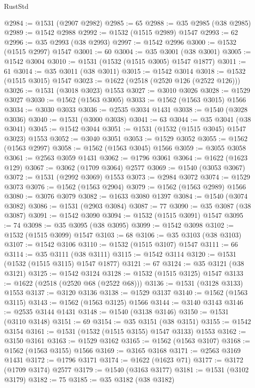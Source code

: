 \begin{lexlean}{RustStd}
\begin{coremodule}
{\begin{coremodule}
{{{{{{{{{{{{{{{{{{{{{{{{{{{{{{{{@2984 := @1531 (@2907 @2982)
@2985 := 65
@2988 := @35 @2985 (@38 @2985)
@2989 := @1542 @2988
@2992 := @1532 (@1515 @2989) @1547
@2993 := 62
@2996 := @35 @2993 (@38 @2993)
@2997 := @1542 @2996
@3000 := @1532 (@1515 @2997) @1547
@3001 := 60
@3004 := @35 @3001 (@38 @3001)
@3005 := @1542 @3004
@3010 := @1531 (@1532 (@1515 @3005) @1547 @1877)
@3011 := 61
@3014 := @35 @3011 (@38 @3011)
@3015 := @1542 @3014
@3018 := @1532 (@1515 @3015) @1547
@3023 := @1622 (@2518 (@2520 @126 (@2522 @126)))
@3026 := @1531 (@3018 @3023) @1553
@3027 := @3010 @3026
@3028 := @1529 @3027
@3030 := @1562 (@1563 @3005)
@3033 := @1562 (@1563 @3015) @1566
@3034 := @3030 @3033
@3036 := @2535 @3034 @1431
@3038 := @1540 (@3028 @3036)
@3040 := @1531 (@3000 @3038)
@3041 := 63
@3044 := @35 @3041 (@38 @3041)
@3045 := @1542 @3044
@3051 := @1531 (@1532 (@1515 @3045) @1547 @3023) @1553
@3052 := @3040 @3051
@3053 := @1529 @3052
@3055 := @1562 (@1563 @2997)
@3058 := @1562 (@1563 @3045) @1566
@3059 := @3055 @3058
@3061 := @2563 @3059 @1431
@3062 := @1796 @3061
@3064 := @1622 (@1623 @129)
@3067 := @3062 (@1709 @3064) @2577
@3069 := @1540 (@3053 @3067)
@3072 := @1531 (@2992 @3069) @1553
@3073 := @2984 @3072
@3074 := @1529 @3073
@3076 := @1562 (@1563 @2904)
@3079 := @1562 (@1563 @2989) @1566
@3080 := @3076 @3079
@3082 := @1633 @3080 @1397
@3084 := @1540 (@3074 @3082)
@3086 := @1531 (@2903 @3084)
@3087 := 77
@3090 := @35 @3087 (@38 @3087)
@3091 := @1542 @3090
@3094 := @1532 (@1515 @3091) @1547
@3095 := 74
@3098 := @35 @3095 (@38 @3095)
@3099 := @1542 @3098
@3102 := @1532 (@1515 @3099) @1547
@3103 := 68
@3106 := @35 @3103 (@38 @3103)
@3107 := @1542 @3106
@3110 := @1532 (@1515 @3107) @1547
@3111 := 66
@3114 := @35 @3111 (@38 @3111)
@3115 := @1542 @3114
@3120 := @1531 (@1532 (@1515 @3115) @1547 @1877)
@3121 := 67
@3124 := @35 @3121 (@38 @3121)
@3125 := @1542 @3124
@3128 := @1532 (@1515 @3125) @1547
@3133 := @1622 (@2518 (@2520 @68 (@2522 @68)))
@3136 := @1531 (@3128 @3133) @1553
@3137 := @3120 @3136
@3138 := @1529 @3137
@3140 := @1562 (@1563 @3115)
@3143 := @1562 (@1563 @3125) @1566
@3144 := @3140 @3143
@3146 := @2535 @3144 @1431
@3148 := @1540 (@3138 @3146)
@3150 := @1531 (@3110 @3148)
@3151 := 69
@3154 := @35 @3151 (@38 @3151)
@3155 := @1542 @3154
@3161 := @1531 (@1532 (@1515 @3155) @1547 @3133) @1553
@3162 := @3150 @3161
@3163 := @1529 @3162
@3165 := @1562 (@1563 @3107)
@3168 := @1562 (@1563 @3155) @1566
@3169 := @3165 @3168
@3171 := @2563 @3169 @1431
@3172 := @1796 @3171
@3174 := @1622 (@1623 @71)
@3177 := @3172 (@1709 @3174) @2577
@3179 := @1540 (@3163 @3177)
@3181 := @1531 (@3102 @3179)
@3182 := 75
@3185 := @35 @3182 (@38 @3182)
}}}}}}}}}}}}}}}}}}}}}}}}}}}}}}}}
\end{coremodule}}
\end{coremodule}
\end{lexlean}
